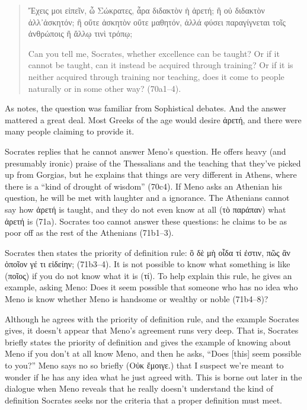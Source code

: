 \documentclass[12pt,letterpaper]{article}
\begin{document}
\begin{quote}
    \begin{greek}Ἔχεις μοι εἰπεῖν, ὦ Σώκρατες, ἆρα διδακτὸν ἡ ἀρετή; ἢ οὐ διδακτὸν ἀλλ᾽ἀσκητόν; ἢ οὔτε ἀσκητὸν οὔτε μαθητόν, ἀλλά φύσει παραγίγνεται τοῖς ἀνθρώποις ἢ ἄλλῳ τινὶ τρόπῳ;\end{greek}
    
   Can you tell me, Socrates, whether excellence can be taught? Or if it cannot be taught, can it instead be acquired through training? Or if it is neither acquired through training nor teaching, does it come to people naturally or in some other way? (70a1--4).
\end{quote}

As \textcite[4]{nehamas1985} notes, the question was familiar from Sophistical debates. And the answer mattered a great deal. Most Greeks of the age would desire \textgreek{ἀρετή}, and there were many people claiming to provide it.

Socrates replies that he cannot answer Meno's question. He offers heavy (and presumably ironic) praise of the Thessalians and the teaching that they've picked up from Gorgias, but he explains that things are very different in Athens, where there is a ``kind of drought of wisdom'' (70c4). If Meno asks an Athenian his question, he will be met with laughter and a ignorance. The Athenians cannot say how \textgreek{ἀρετή} is taught, and they do not even know at all (\textgreek{τὸ παράπαν}) what \textgreek{ἀρετή} is (71a). Socrates too cannot answer these questions: he claims to be as poor off as the rest of the Athenians (71b1--3). 

Socrates then states the priority of definition rule: \textgreek{ὃ δὲ μὴ οἶδα τί ἐστιν, πῶς ἂν ὁποῖον γέ τι εἰδείην;} (71b3--4). It is not possible to know what something is like (\textgreek{ποῖος}) if you do not know what it is (\textgreek{τί}). To help explain this rule, he gives an example, asking Meno: Does it seem possible that someone who has no idea who Meno is know whether Meno is handsome or wealthy or noble (71b4--8)?

Although he agrees with the priority of definition rule, and the example Socrates gives, it doesn't appear that Meno's agreement runs very deep. That is, Socrates briefly states the priority of definition and gives the example of knowing about Meno if you don't at all know Meno, and then he asks, ``Does [this] seem possible to you?'' Meno says no so briefly (\textgreek{Οὐκ ἔμοιγε.}) that I suspect we're meant to wonder if he has any idea what he just agreed with. This is borne out later in the dialogue when Meno reveals that he really doesn't understand the kind of definition Socrates seeks nor the criteria that a proper definition must meet.
\end{document}

